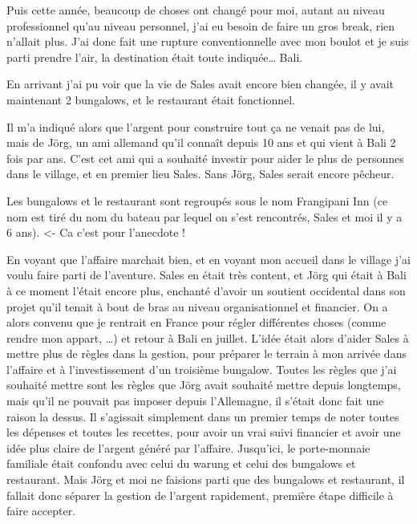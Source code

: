 \par
Puis cette année, beaucoup de choses ont changé pour moi, autant au niveau professionnel qu’au niveau personnel, j’ai eu besoin de faire un gros break, rien n’allait plus. J’ai donc fait une rupture conventionnelle avec mon boulot et je suis parti prendre l’air, la destination était toute indiquée… Bali.

\par
En arrivant j’ai pu voir que la vie de Sales avait encore bien changée, il y avait maintenant 2 bungalows, et le restaurant était fonctionnel.

\par
Il m’a indiqué alors que l’argent pour construire tout ça ne venait pas de lui, mais de Jörg, un ami allemand qu’il connaît depuis 10 ans et qui vient à Bali 2 fois par ans. C’est cet ami qui a souhaité investir pour aider le plus de personnes dans le village, et en premier lieu Sales. Sans Jörg, Sales serait encore pêcheur.

\par
Les bungalows et le restaurant sont regroupés sous le nom Frangipani Inn (ce nom est tiré du nom du bateau par lequel on s’est rencontrés, Sales et moi il y a 6 ans). <- Ca c’est pour l’anecdote !

\par
En voyant que l’affaire marchait bien, et en voyant mon accueil dans le village j’ai voulu faire parti de l’aventure. Sales en était très content, et Jörg qui était à Bali à ce moment l’était encore plus, enchanté d’avoir un soutient occidental dans son projet qu’il tenait à bout de bras au niveau organisationnel et financier. On a alors convenu que je rentrait en France pour régler différentes choses (comme rendre mon appart, …) et retour à Bali en juillet. L’idée était alors d’aider Sales à mettre plus de règles dans la gestion, pour préparer le terrain à mon arrivée dans l’affaire et à l’investissement d’un troisième bungalow. Toutes les règles que j’ai souhaité mettre sont les règles que Jörg avait souhaité mettre depuis longtemps, mais qu’il ne pouvait pas imposer depuis l’Allemagne, il s’était donc fait une raison la dessus. Il s’agissait simplement dans un premier temps de noter toutes les dépenses et toutes les recettes, pour avoir un vrai suivi financier et avoir une idée plus claire de l’argent généré par l’affaire. Jusqu’ici, le porte-monnaie familiale était confondu avec celui du warung et celui des bungalows et restaurant. Mais Jörg et moi ne faisions parti que des bungalows et restaurant, il fallait donc séparer la gestion de l’argent rapidement, première étape difficile à faire accepter.

